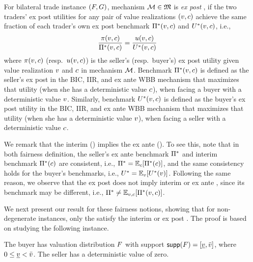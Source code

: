 \begin{definition}
\label{def:ex post ks fairness}
    For bilateral trade instance $(F,G)$, mechanism $\mathcal{M}\in \mathfrak{M}$ is \emph{ex post {\ksfair}}, if the two traders' ex post utilities for any pair of value realizations $(v, c)$ achieve the same {fraction of} each trader's own ex post benchmark $\Pi^*(v, c)$ and $U^*(v, c)$, i.e.,
    \begin{align*}
        \frac{\pi(v, c)}{\Pi^*(v, c)}
        = \frac{u(v, c)}{U^*(v,c)}
    \end{align*}
    where $\pi(v, c)$ (resp.\ $u(v, c)$) is the seller's (resp.\ buyer's) ex post utility given value realization $v$ and $c$ in mechanism $\mathcal{M}$. Benchmark $\Pi^*(v, c)$ is defined as the seller's ex post in the BIC, IIR, and ex ante WBB mechanism that maximizes that utility (when she has a deterministic value $c$), when facing a buyer with a deterministic value $v$. Similarly, benchmark $U^*(v,c)$ is defined as the buyer's ex post utility in the BIC, IIR, and ex ante WBB mechanism that maximizes that utility (when she has a deterministic value $v$), when facing a seller with a deterministic value $c$.
\end{definition}

We remark that the interim {\ksfairness} () implies the ex ante {\ksfairness} (). To see this, note that in both fairness definition, the seller's ex ante benchmark $\Pi^*$ and interim benchmark $\Pi^*(c)$ are consistent, i.e., $\sellerbenchmark = \expect[\cost]{\sellerbenchmark(\cost)}$, and the same consistency holds for the buyer's benchmarks, i.e., $\buyerbenchmark = \expect[\val]{\buyerbenchmark(\val)}$. Following the same reason, we observe that the ex post {\ksfairness} does not imply interim or ex ante {\ksfairness}, since its benchmark may be different, i.e., $\sellerbenchmark \not= \expect[\val,\cost]{\sellerbenchmark(\val,\cost)}$. 

We next present our result for these fairness notions, showing that for non-degenerate instances, only the {\NoTrade} satisfy the interim or ex post {\ksfairness}. The proof is based on studying the following instance.


\begin{example}
\label{example:interim fairness:zero-value seller uniform buyer}
The buyer has valuation distribution $F$ with support ${\sf supp}(F) = [\underline{v}, \bar{v}]$, where $0\leq \underline{v} < \bar{v}$. The seller has a deterministic value of zero.
\end{example}

